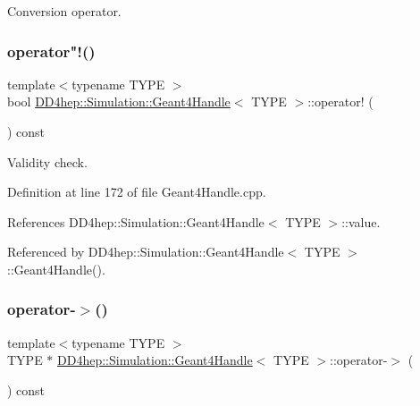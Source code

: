 Conversion operator. 

\hypertarget{class_d_d4hep_1_1_simulation_1_1_geant4_handle_ade2f03e864c95c51ff743dbe10fae34e}{}\label{class_d_d4hep_1_1_simulation_1_1_geant4_handle_ade2f03e864c95c51ff743dbe10fae34e} 
\subsubsection{\texorpdfstring{operator"!()}{operator!()}}
{\footnotesize\ttfamily template$<$typename T\+Y\+PE $>$ \\
bool \hyperlink{class_d_d4hep_1_1_simulation_1_1_geant4_handle}{D\+D4hep\+::\+Simulation\+::\+Geant4\+Handle}$<$ T\+Y\+PE $>$\+::operator! (\begin{DoxyParamCaption}{ }\end{DoxyParamCaption}) const}



Validity check. 



Definition at line 172 of file Geant4\+Handle.\+cpp.



References D\+D4hep\+::\+Simulation\+::\+Geant4\+Handle$<$ T\+Y\+P\+E $>$\+::value.



Referenced by D\+D4hep\+::\+Simulation\+::\+Geant4\+Handle$<$ T\+Y\+P\+E $>$\+::\+Geant4\+Handle().

\hypertarget{class_d_d4hep_1_1_simulation_1_1_geant4_handle_a9fad73f7abe0c3389d15fe9d16ddb09f}{}\label{class_d_d4hep_1_1_simulation_1_1_geant4_handle_a9fad73f7abe0c3389d15fe9d16ddb09f} 
\subsubsection{\texorpdfstring{operator-\/$>$()}{operator->()}}
{\footnotesize\ttfamily template$<$typename T\+Y\+PE $>$ \\
T\+Y\+PE $\ast$ \hyperlink{class_d_d4hep_1_1_simulation_1_1_geant4_handle}{D\+D4hep\+::\+Simulation\+::\+Geant4\+Handle}$<$ T\+Y\+PE $>$\+::operator-\/$>$ (\begin{DoxyParamCaption}{ }\end{DoxyParamCaption}) const}



